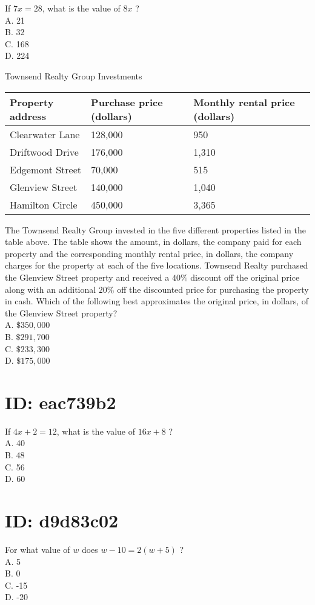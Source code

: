If $7 x=28$, what is the value of $8 x$ ?\\
A. 21\\
B. 32\\
C. 168\\
D. 224

Townsend Realty Group Investments

\begin{center}
\begin{tabular}{|l|l|l|}
\hline
Property address & Purchase price (dollars) & Monthly rental price (dollars) \\
\hline
Clearwater Lane & 128,000 & 950 \\
\hline
Driftwood Drive & 176,000 & 1,310 \\
\hline
Edgemont Street & 70,000 & 515 \\
\hline
Glenview Street & 140,000 & 1,040 \\
\hline
Hamilton Circle & 450,000 & 3,365 \\
\hline
\end{tabular}
\end{center}

The Townsend Realty Group invested in the five different properties listed in the table above. The table shows the amount, in dollars, the company paid for each property and the corresponding monthly rental price, in dollars, the company charges for the property at each of the five locations. Townsend Realty purchased the Glenview Street property and received a $40 \%$ discount off the original price along with an additional $20 \%$ off the discounted price for purchasing the property in cash. Which of the following best approximates the original price, in dollars, of the Glenview Street property?\\
A. $\$ 350,000$\\
B. $\$ 291,700$\\
C. $\$ 233,300$\\
D. $\$ 175,000$

\section*{ID: eac739b2}
If $4 x+2=12$, what is the value of $16 x+8$ ?\\
A. 40\\
B. 48\\
C. 56\\
D. 60

\section*{ID: d9d83c02}
For what value of $w$ does $w-10=2(w+5)$ ?\\
A. 5\\
B. 0\\
C. -15\\
D. -20

